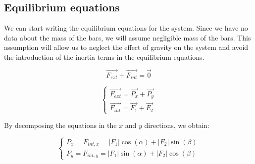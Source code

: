 \subsection{Equilibrium equations}
\label{subsec:equilibrium_equations}

We can start writing the equilibrium equations for the system.
Since we have no data about the mass of the bars, we will assume negligible mass of the bars.
This assumption will allow us to neglect the effect of gravity on the system and avoid the introduction of the inertia terms in the equilibrium equations.

\begin{equation}
    \vec{F_{ext}} + \vec{F_{int}} = \vec{0}
    \label{eq:equilibrium_equations_vectorial_1}
\end{equation}

\begin{equation}
    \begin{cases}
        \vec{F_{ext}} = \vec{P_x} + \vec{P_y} \\
        \vec{F_{int}} = \vec{F_1} + \vec{F_2}
    \end{cases}
    \label{eq:equilibrium_equations_vectorial_2}
\end{equation}

By decomposing the equations in the $x$ and $y$ directions, we obtain:

\begin{equation}
    \begin{cases}
        P_x = F_{int,x} = |F_1|\cos(\alpha) + |F_2|\sin(\beta) \\
        P_y = F_{int,y} = |F_1|\sin(\alpha) + |F_2|\cos(\beta)
    \end{cases}
    \label{eq:equilibrium_equations_scalar}
\end{equation}
